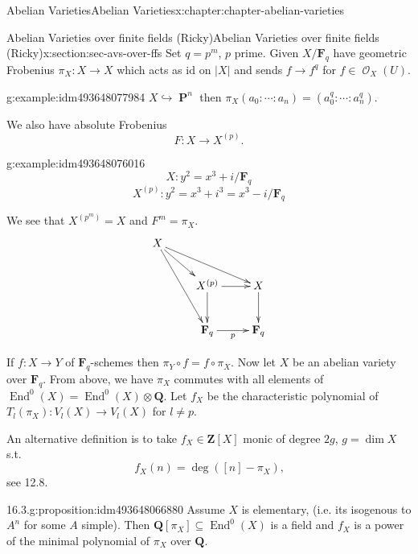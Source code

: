 \documentclass[oneside,10pt,]{book}
\numberwithin{equation}{section}
\newcommand{\sheaf}[1]{\operatorname{\mathcal{#1}}}
\newcommand{\lb}{[}
\newcommand{\rb}{]}
\newcommand{\ZZ}{\mathbf{Z}}
\newcommand{\QQ}{\mathbf{Q}}
\newcommand{\FF}{\mathbf{F}}
\newcommand{\id}{\mathrm{id}}
\DeclareMathOperator{\End}{End}
\DeclareMathOperator{\PP}{\mathbf{P}}
\begin{document}
\begin{chapterptx}{Abelian Varieties}{}{Abelian Varieties}{}{}{x:chapter:chapter-abelian-varieties}
%
%
\typeout{************************************************}
\typeout{************************************************}
%
\begin{sectionptx}{Abelian Varieties over finite fields (Ricky)}{}{Abelian Varieties over finite fields (Ricky)}{}{}{x:section:sec-avs-over-ffs}
Set \(q = p^m\), \(p\) prime. Given \(X/\FF_q\) have  geometric Frobenius \(\pi_X\colon X \to X\) which acts as \(\id\) on \(|X|\) and sends \(f\to f^q\) for \(f\in \sheaf O_X(U)\).%
\begin{example}{}{g:example:idm493648077984}%
\(X \hookrightarrow \PP^n\) then \(\pi_X(a_0:\cdots :a_n) = (a_0^q : \cdots :a_n^q)\).%
\end{example}
We also have absolute Frobenius%
\begin{equation*}
F\colon X\to X^{(p)}\text{.}
\end{equation*}
%
\begin{example}{}{g:example:idm493648076016}%
%
\begin{equation*}
X \colon y^2 = x^3 + i / \FF_q
\end{equation*}
%
\begin{equation*}
X^{(p)} \colon y^2 = x^3 + i^3 = x^3 - i / \FF_q
\end{equation*}
%
\end{example}
We see that \(X^{(p^m)} = X\) and \(F^m = \pi_X\).%
\begin{equation*}
\xymatrix{
X \ar[drr] \ar[dr]\ar[ddr] & &\\
& X^{(p)} \ar[d]\ar[r] & X\ar[d]\\
& \FF_q \ar[r]_p &\FF_q
}
\end{equation*}
%
\par
If \(f\colon X \to Y\) of \(\FF_q\)-schemes then \(\pi_Y \circ f = f\circ \pi_X\). Now let \(X\) be an abelian variety over \(\FF_q\). From above, we have \(\pi_X\) commutes with all elements of \(\End^0(X) = \End^0(X)\otimes \QQ\). Let \(f_X\) be the characteristic polynomial of \(T_l(\pi_X) \colon V_l(X) \to V_l(X)\) for \(l \ne p\).%
\par
An alternative definition is to take \(f_X\in \ZZ\lb X\rb\) monic of degree \(2g \), \(g = \dim X\) s.t.%
\begin{equation*}
f_X(n) = \deg([n] -\pi_X)\text{,}
\end{equation*}
see 12.8.%
\begin{proposition}{16.3.}{}{g:proposition:idm493648066880}%
Assume \(X\) is elementary, (i.e. its isogenous to \(A^n\) for some \(A\) simple). Then  \(\QQ\lb \pi_X\rb\subseteq \End^0(X)\) is a field and \(f_X\) is a power of the minimal polynomial of \(\pi_X\) over \(\QQ\).%

\end{proposition}
\end{sectionptx}
\end{chapterptx}
\end{document}
